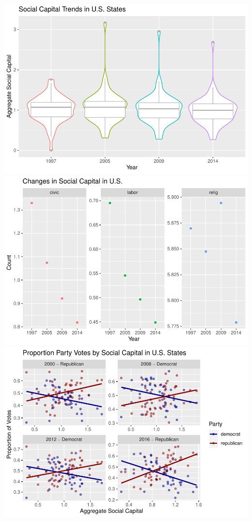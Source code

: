 \documentclass[
  english,
  man]{apa6}
\begin{document}
\includegraphics{Script_files/figure-latex/visualization part 1-1.pdf} \includegraphics{Script_files/figure-latex/visualization part 1-2.pdf} \includegraphics{Script_files/figure-latex/visualization part 1-3.pdf}
\end{document}
